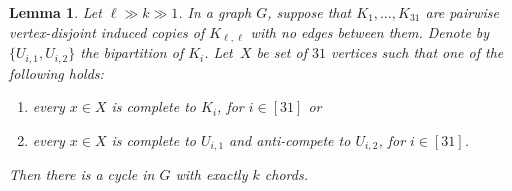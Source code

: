 \documentclass[11pt,english]{article}
\theoremstyle{plain}
\newtheorem{lem}[thm]{Lemma}
\theoremstyle{definition}
\theoremstyle{remark}
\begin{document}
        \begin{lem}\label{lem:manyverticeswithmanyneighboursinKmms}
            Let $\ell \gg k \gg 1$. In a graph $G$, suppose that $K_1, \ldots, K_{31}$ are pairwise vertex-disjoint induced copies of $K_{\ell, \ell}$ with no edges between them. Denote by $\{U_{i,1}, U_{i,2}\}$ the bipartition of $K_i$.
            Let~$X$ be  set of  $31$ vertices such that one of the following holds:
            \begin{enumerate}[label = \rm(\alph*)]
                \item \label{itm:complete-both-sides}
                    every $x \in X$ is complete to $K_i$, for $i \in [31]$ or
                \item \label{itm:complete-one-side}
                    every $x \in X$ is complete to $U_{i,1}$ and anti-compete to $U_{i,2}$, for $i \in [31]$.
            \end{enumerate}
            Then there is a cycle in $G$ with exactly $k$ chords.
        \end{lem}
        
\end{document}
